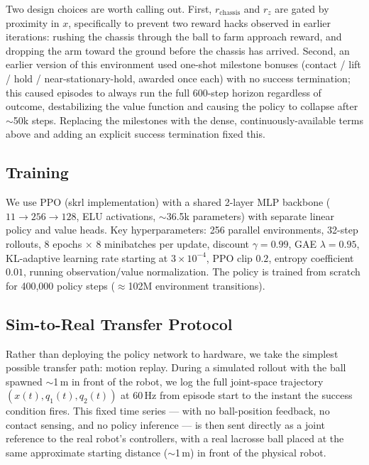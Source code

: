 \documentclass[11pt]{article}
\begin{document}
Two design choices are worth calling out. First, $r_{\text{chassis}}$ and
$r_z$ are gated by proximity in $x$, specifically to prevent two reward hacks
observed in earlier iterations: rushing the chassis through the ball to farm
approach reward, and dropping the arm toward the ground before the chassis has
arrived. Second, an earlier version of this environment used one-shot
milestone bonuses (contact / lift / hold / near-stationary-hold, awarded once
each) with no success termination; this caused episodes to always run the
full 600-step horizon regardless of outcome, destabilizing the value function
and causing the policy to collapse after $\sim$50k steps. Replacing the
milestones with the dense, continuously-available terms above and adding an
explicit success termination fixed this.

\subsection{Training}

We use PPO (skrl implementation) with a shared 2-layer MLP backbone
($11 \to 256 \to 128$, ELU activations, $\sim$36.5k parameters) with separate
linear policy and value heads. Key hyperparameters: 256 parallel environments,
32-step rollouts, 8 epochs $\times$ 8 minibatches per update, discount
$\gamma = 0.99$, GAE $\lambda = 0.95$, KL-adaptive learning rate starting at
$3\times10^{-4}$, PPO clip $0.2$, entropy coefficient $0.01$, running
observation/value normalization. The policy is trained from scratch for
400{,}000 policy steps ($\approx$102M environment transitions).

\subsection{Sim-to-Real Transfer Protocol}

Rather than deploying the policy network to hardware, we take the simplest
possible transfer path: motion replay. During a simulated rollout with the
ball spawned $\sim$1\,m in front of the robot, we log the full joint-space
trajectory $(x(t), q_1(t), q_2(t))$ at 60\,Hz from episode start to the instant
the success condition fires. This fixed time series --- with no ball-position
feedback, no contact sensing, and no policy inference --- is then sent
directly as a joint reference to the real robot's controllers, with a real
lacrosse ball placed at the same approximate starting distance
($\sim$1\,m) in front of the physical robot.
\end{document}
